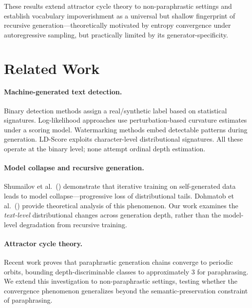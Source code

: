 \documentclass[letterpaper]{article}
\begin{document}
These results extend attractor cycle theory to non-paraphrastic settings and establish vocabulary impoverishment as a universal but shallow fingerprint of recursive generation---theoretically motivated by entropy convergence under autoregressive sampling, but practically limited by its generator-specificity.

\section{Related Work}
\label{sec:related}

\paragraph{Machine-generated text detection.}
Binary detection methods assign a real/synthetic label based on statistical signatures. Log-likelihood approaches \citep{mitchell2023detectgpt,bao2024fastdetectgpt} use perturbation-based curvature estimates under a scoring model. Watermarking methods \citep{kirchenbauer2023watermark} embed detectable patterns during generation. LD-Score \citep{tulchinskii2024ldscore} exploits character-level distributional signatures. All these operate at the binary level; none attempt ordinal depth estimation.

\paragraph{Model collapse and recursive generation.}
Shumailov et al.\ (\citeyear{shumailov2024modelcollapse}) demonstrate that iterative training on self-generated data leads to model collapse---progressive loss of distributional tails. Dohmatob et al.\ (\citeyear{dohmatob2024tale}) provide theoretical analysis of this phenomenon. Our work examines the \emph{text-level} distributional changes across generation depth, rather than the model-level degradation from recursive training.

\paragraph{Attractor cycle theory.}
Recent work \citep{anonymous2025attractor} proves that paraphrastic generation chains converge to periodic orbits, bounding depth-discriminable classes to approximately 3 for paraphrasing. We extend this investigation to non-paraphrastic settings, testing whether the convergence phenomenon generalizes beyond the semantic-preservation constraint of paraphrasing.
\end{document}
